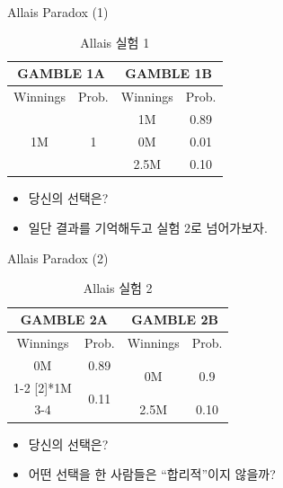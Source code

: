 \documentclass[final]{beamer}
\begin{document}
\begin{frame}[t]{Allais Paradox (1)}
	\begin{table} 
	\setlength{\tabcolsep}{1.2em}
	\begin{tabular}{|c|c||c|c|} \hline
	\multicolumn{2}{|c||}{GAMBLE 1A}&\multicolumn{2}{c|}{GAMBLE 1B} \\ \hline
	Winnings & Prob. & Winnings & Prob. \\ \hline
	\multirow{3}[2]{*}{1M} & \multirow{3}[2]{*}{1} & 1M & 0.89 \\ \cline{3-4}
	& & 0M & 0.01 \\  \cline{3-4}
	& & 2.5M & 0.10 \\  \hline
	\end{tabular}
	\caption{Allais 실험 1}\label{tab:01}
	\end{table}
	\begin{itemize}
		\item 당신의 선택은? 
		\item 일단 결과를 기억해두고 실험 2로 넘어가보자. 
	\end{itemize}
\end{frame}


\begin{frame}[t]{Allais Paradox (2)}
	\begin{table}
	\setlength{\tabcolsep}{1.2em}
	\begin{tabular}{|c|c||c|c|} \hline
	\multicolumn{2}{|c||}{GAMBLE 2A}&\multicolumn{2}{c|}{GAMBLE 2B} \\ \hline
	Winnings & Prob. & Winnings & Prob. \\ \hline
	0M & 0.89 & \multirow{2}[2]{*}{0M} & \multirow{2}[2]{*}{0.9} \\ \cline{1-2}
	\multirow{2}[2]{*}{1M} & \multirow{2}[2]{*}{0.11} & & \\  \cline{3-4}
	& & 2.5M & 0.10 \\ \hline
	\end{tabular}
	\caption{Allais 실험 2}\label{tab:02}
	\end{table}
	\begin{itemize}
		\item 당신의 선택은?
		\item 어떤 선택을 한 사람들은 ``합리적''이지 않을까?
	\end{itemize}
\end{frame}
\end{document}
